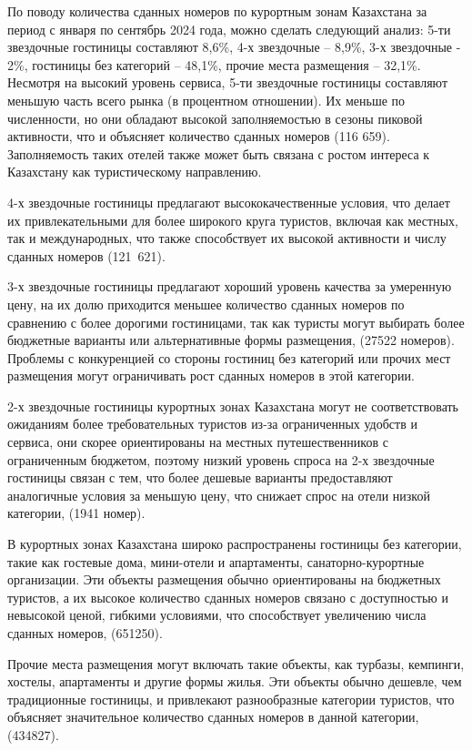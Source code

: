 По поводу количества сданных номеров по курортным зонам Казахстана за
период с января по сентябрь 2024 года, можно сделать следующий анализ:
5-ти звездочные гостиницы составляют 8,6\%, 4-х звездочные -- 8,9\%, 3-х
звездочные - 2\%, гостиницы без категорий -- 48,1\%, прочие места
размещения -- 32,1\%. Несмотря на высокий уровень сервиса, 5-ти
звездочные гостиницы составляют меньшую часть всего рынка (в процентном
отношении). Их меньше по численности, но они обладают высокой
заполняемостью в сезоны пиковой активности, что и объясняет количество
сданных номеров (116 659). Заполняемость таких отелей также может быть
связана с ростом интереса к Казахстану как туристическому направлению.

4-х звездочные гостиницы предлагают высококачественные условия, что
делает их привлекательными для более широкого круга туристов, включая
как местных, так и международных, что также способствует их высокой
активности и числу сданных номеров (121~621).

3-х звездочные гостиницы предлагают хороший уровень качества за
умеренную цену, на их долю приходится меньшее количество сданных номеров
по сравнению с более дорогими гостиницами, так как туристы могут
выбирать более бюджетные варианты или альтернативные формы размещения,
(27522 номеров). Проблемы с конкуренцией со стороны гостиниц без
категорий или прочих мест размещения могут ограничивать рост сданных
номеров в этой категории.

2-х звездочные гостиницы курортных зонах Казахстана могут не
соответствовать ожиданиям более требовательных туристов из-за
ограниченных удобств и сервиса, они скорее ориентированы на местных
путешественников с ограниченным бюджетом, поэтому низкий уровень спроса
на 2-х звездочные гостиницы связан с тем, что более дешевые варианты
предоставляют аналогичные условия за меньшую цену, что снижает спрос на
отели низкой категории, (1941 номер).

В курортных зонах Казахстана широко распространены гостиницы без
категории, такие как гостевые дома, мини-отели и апартаменты,
санаторно-курортные организации. Эти объекты размещения обычно
ориентированы на бюджетных туристов, а их высокое количество сданных
номеров связано с доступностью и невысокой ценой, гибкими условиями, что
способствует увеличению числа сданных номеров, (651250).

Прочие места размещения могут включать такие объекты, как турбазы,
кемпинги, хостелы, апартаменты и другие формы жилья. Эти объекты обычно
дешевле, чем традиционные гостиницы, и привлекают разнообразные
категории туристов, что объясняет значительное количество сданных
номеров в данной категории, (434827).

